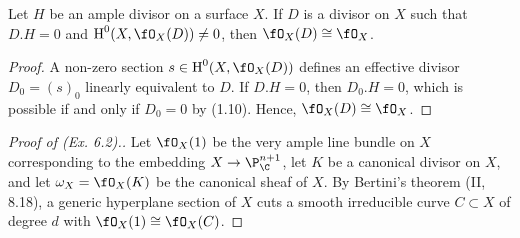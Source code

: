 \documentclass[a4paper]{article}
\begin{document}
\begin{enumerate} [label=\textbf{\arabic*.}, leftmargin=0em]
            \begin{lemma}
                  Let $H$ be an ample divisor on a surface $X$.
                  If $D$ is a divisor on $X$ such that $D.H = 0$ and $\cH^0(X, \fO_X(D)) \neq 0$, then $\fO_X(D) \cong \fO_X$.
            \end{lemma}

            \begin{proof}
                  A non-zero section $s \in \cH^0(X, \fO_X(D))$ defines an effective divisor $D_0 = (s)_0$ linearly equivalent to $D$.
                  If $D.H = 0$, then $D_0.H = 0$, which is possible if and only if $D_0 = 0$ by (1.10).
                  Hence, $\fO_X(D) \cong \fO_X$.
            \end{proof}

            \begin{proof} [Proof of (Ex. 6.2).]
                  Let $\fO_X(1)$ be the very ample line bundle on $X$ corresponding to the embedding $X \to \P^{n + 1}_\C$, let $K$ be a canonical divisor on $X$, and let $\omega_X = \fO_X(K)$ be the canonical sheaf of $X$.
                  By Bertini's theorem (II, 8.18), a generic hyperplane section of $X$ cuts a smooth irreducible curve $C \subset X$ of degree $d$ with $\fO_X(1) \cong \fO_X(C)$.


\end{proof}
\end{enumerate}
\end{document}
